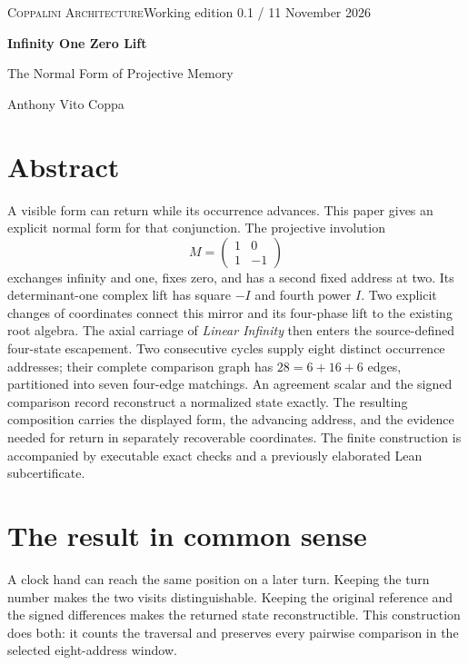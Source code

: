 \documentclass[11pt]{article}
\theoremstyle{definition}\newtheorem{definition}[theorem]{Definition}
\begin{document}

\setcounter{page}{1}

{\small\scshape Coppalini Architecture}\hfill{\small Working edition 0.1 / 11 November 2026}\par
\vspace{8pt}
{\LARGE\bfseries Infinity One Zero Lift}\par
{\large The Normal Form of Projective Memory}\par
Anthony Vito Coppa
\vspace{4pt}

\section*{Abstract}
A visible form can return while its occurrence advances. This paper gives an explicit normal form for that conjunction. The projective involution
\[
 M=\begin{pmatrix}1&0\\1&-1\end{pmatrix}
\]
exchanges infinity and one, fixes zero, and has a second fixed address at two. Its determinant-one complex lift has square $-I$ and fourth power $I$. Two explicit changes of coordinates connect this mirror and its four-phase lift to the existing root algebra. The axial carriage of \emph{Linear Infinity} then enters the source-defined four-state escapement. Two consecutive cycles supply eight distinct occurrence addresses; their complete comparison graph has $28=6+16+6$ edges, partitioned into seven four-edge matchings. An agreement scalar and the signed comparison record reconstruct a normalized state exactly. The resulting composition carries the displayed form, the advancing address, and the evidence needed for return in separately recoverable coordinates. The finite construction is accompanied by executable exact checks and a previously elaborated Lean subcertificate.

\section*{The result in common sense}
A clock hand can reach the same position on a later turn. Keeping the turn number makes the two visits distinguishable. Keeping the original reference and the signed differences makes the returned state reconstructible. This construction does both: it counts the traversal and preserves every pairwise comparison in the selected eight-address window.
\end{document}
